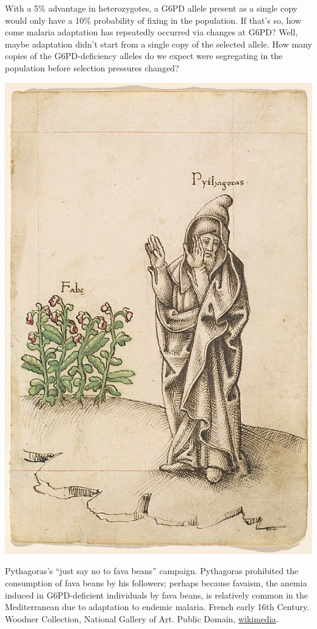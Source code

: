 {With a 5\% advantage in heterozygotes, a G6PD allele present as a
single copy would only have a 10\% probability of
fixing in the population. If that's so, how come malaria adaptation has
repeatedly occurred via changes at G6PD? Well, maybe adaptation didn't
start from a single copy of the selected allele. How many copies of
the G6PD-deficiency alleles do we expect were segregating in the population before
selection pressures changed? 
\begin{marginfigure}
\begin{center}
  \includegraphics[width=\textwidth]{illustration_images/Genetic_drift_selection/Pythagoras_fava_beans/586px-Do_Not_Eat_Beans.jpg}
\caption{
Pythagoras's ``just say no to fava beans'' campaign. 
Pythagoras prohibited the consumption of fava beans by his followers; perhaps because favaism, the anemia induced in G6PD-deficient
individuals by fava beans, is relatively common in the Mediterranean due
to adaptation to endemic malaria. French early 16th
Century. Woodner Collection, National Gallery of Art. Public Domain, \href{https://en.wikipedia.org/wiki/Pythagoras\#/media/File:Do_Not_Eat_Beans.jpg}{wikimedia}. } \label{fig:fava}
\end{center}
\end{marginfigure}

}
